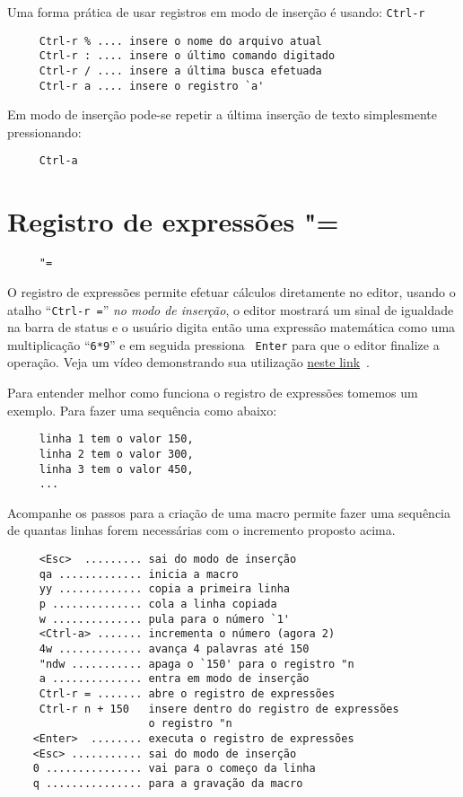 Uma forma prática de usar registros em modo de inserção é usando:
\verb|Ctrl-r|


\begin{verbatim}
     Ctrl-r % .... insere o nome do arquivo atual
     Ctrl-r : .... insere o último comando digitado
     Ctrl-r / .... insere a última busca efetuada
     Ctrl-r a .... insere o registro `a'
\end{verbatim}

Em modo de inserção pode-se repetir a última inserção de texto
simplesmente pressionando:

\begin{verbatim}
     Ctrl-a
\end{verbatim}

\section{Registro de expressões "=}
\label{sec:Registro de expressões "=}

\begin{verbatim}
     "=
\end{verbatim}

O registro de expressões permite efetuar cálculos diretamente no editor, usando
o atalho ``{\tt Ctrl-r =}'' {\em no modo de inserção}, o editor mostrará um
sinal de igualdade na barra de status e o usuário digita então uma expressão
matemática como uma multiplicação ``{\tt 6*9}'' e em seguida pressiona {\tt
Enter} para que o editor finalize a operação.  Veja um vídeo demonstrando sua
utilização \href{http://vimeo.com/2967392}{neste link}~\cite{RegistroDeExpressoes}.


Para entender melhor como funciona o registro de expressões tomemos um exemplo.
Para fazer uma sequência como abaixo:

\begin{verbatim}
     linha 1 tem o valor 150,
     linha 2 tem o valor 300,
     linha 3 tem o valor 450,
     ...
\end{verbatim}

Acompanhe os passos para a criação de uma macro permite fazer uma
sequência de quantas linhas forem necessárias com o incremento proposto acima.

\begin{verbatim}
     <Esc>  ......... sai do modo de inserção
     qa ............. inicia a macro
     yy ............. copia a primeira linha
     p .............. cola a linha copiada
     w .............. pula para o número `1'
     <Ctrl-a> ....... incrementa o número (agora 2)
     4w ............. avança 4 palavras até 150
     "ndw ........... apaga o `150' para o registro "n
     a .............. entra em modo de inserção
     Ctrl-r = ....... abre o registro de expressões
     Ctrl-r n + 150   insere dentro do registro de expressões
                      o registro "n
    <Enter>  ........ executa o registro de expressões
    <Esc> ........... sai do modo de inserção
    0 ............... vai para o começo da linha
    q ............... para a gravação da macro
\end{verbatim}

